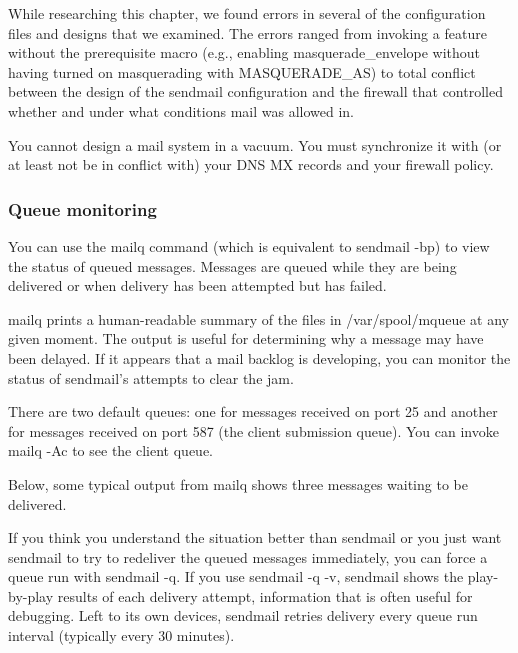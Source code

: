 While researching this chapter, we found errors in several of the
configuration files and designs that we examined. The errors ranged from
invoking a feature without the prerequisite macro (e.g., enabling
{masquerade\_envelope} without having turned on masquerading with
{MASQUERADE\_AS}) to total conflict between the design of the {sendmail}
configuration and the firewall that controlled whether and under what
conditions mail was allowed in.

You cannot design a mail system in a vacuum. You must synchronize it
with (or at least not be in conflict with) your DNS MX records and your
firewall policy.

\subsubsection[Queue
monitoring]{\texorpdfstring{\protect\hypertarget{part0026_split_039.htmlux5cux23_idTextAnchor1118}{}{}Queue
monitoring}{Queue monitoring}}

\protect\hypertarget{part0026_split_039.htmlux5cux23_idIndexMarker2603}{}{}You
can use the
\protect\hypertarget{part0026_split_039.htmlux5cux23_idIndexMarker2604}{}{}{mailq}
command (which is equivalent to {sendmail -bp}) to view the status of
queued messages. Messages are queued while they are being delivered or
when delivery has been attempted but has failed.

{mailq} prints a human-readable summary of the files in
{/var/spool/mqueue} at any given moment. The output is useful for
determining why a message may have been delayed. If it appears that a
mail backlog is developing, you can monitor the status of {sendmail}'s
attempts to clear the jam.

There are two default queues: one for messages received on port 25 and
another for messages received on port 587 (the client submission queue).
You can invoke {mailq -Ac} to see the client queue.

Below, some typical output from {mailq} shows three messages waiting to
be delivered.


If you think you understand the situation better than {sendmail} or you
just want {sendmail} to try to redeliver the queued messages
immediately, you can force a queue run with {sendmail -q}. If you use
{sendmail -q -v}, {sendmail} shows the play-by-play results of each
delivery attempt, information that is often useful for debugging. Left
to its own devices, {sendmail} retries delivery every queue run interval
(typically every 30 minutes).

